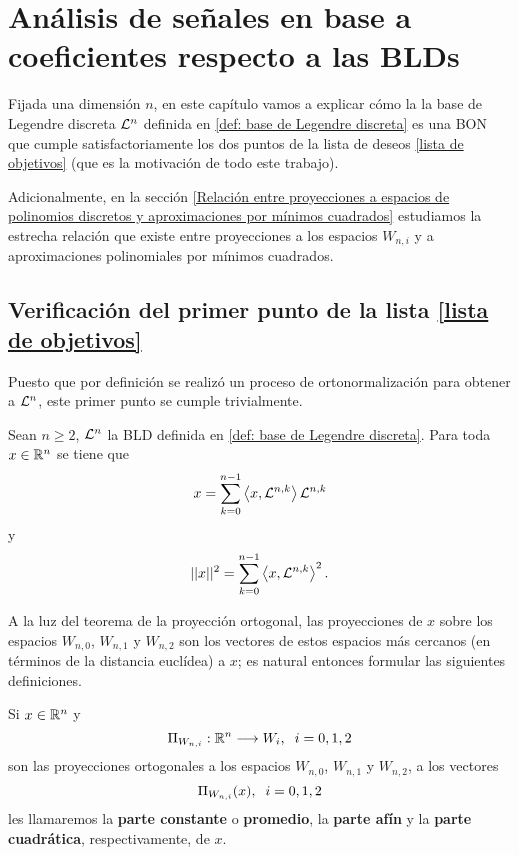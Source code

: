 \chapter{Análisis de señales en base a coeficientes respecto a las BLDs}

Fijada una dimensión $n$, 
en este capítulo vamos a explicar cómo la 
la base de Legendre discreta $\mathcal{L}^{n}$ definida en 
\ref{def: base de Legendre discreta}
es una BON que cumple satisfactoriamente los dos puntos de
la lista de deseos
\ref{lista de objetivos}
(que es la motivación de todo este trabajo).



Adicionalmente, en la sección 
\ref{Relación entre proyecciones a espacios de polinomios discretos y aproximaciones por mínimos cuadrados}
estudiamos la estrecha relación que existe entre
proyecciones a los espacios $W_{n,i}$ y a aproximaciones
polinomiales por mínimos cuadrados.


\section{Verificación del primer punto de la lista \ref{lista de objetivos}}
Puesto que por definición se realizó un proceso de ortonormalización
para obtener a $\mathcal{L}^{n}$, este primer punto se cumple trivialmente.

\begin{obs}
Sean $n \geq 2$, $\mathcal{L}^{n}$ la BLD definida en 
\ref{def: base de Legendre discreta}.
Para toda $x \in \mathbb{R}^{n}$ se tiene que 
\[
x = \sum\limits_{k=0}^{n-1}\left\langle x, \mathcal{L}^{n,k} \right\rangle 
\mathcal{L}^{n,k}
\]
y
\[
|| x ||^{2} = \sum\limits_{k=0}^{n-1}\left\langle x, \mathcal{L}^{n,k} \right\rangle^{2}.
\]
\end{obs}

\noindent A la luz del teorema de la proyección ortogonal, 
las proyecciones de $x$ sobre los espacios 
$W_{n,0}$, $W_{n,1}$
y $W_{n,2}$ son los vectores
de estos espacios más cercanos (en términos de la 
distancia euclídea)
a $x$; es natural entonces formular
las siguientes definiciones.



\begin{defi}
Si $x \in \mathbb{R}^{n}$ y
\begin{equation}
\label{eq0: 5Dic}
\Pi_{W_{n,i}}: \mathbb{R} ^{n}  \longrightarrow W_{i}, \hspace{0.2cm}
i=0,1,2
\end{equation}
son las proyecciones ortogonales
a los espacios 
$W_{n,0}$, $W_{n,1}$ y $W_{n,2}$, a los vectores
\[
\Pi_{W_{n,i}}(x), \hspace{0.2cm} i=0,1,2
\]
les llamaremos la \textbf{parte constante}
o \textbf{promedio}, la \textbf{parte afín} y la
\textbf{parte cuadrática}, respectivamente, de $x$.
\end{defi}

